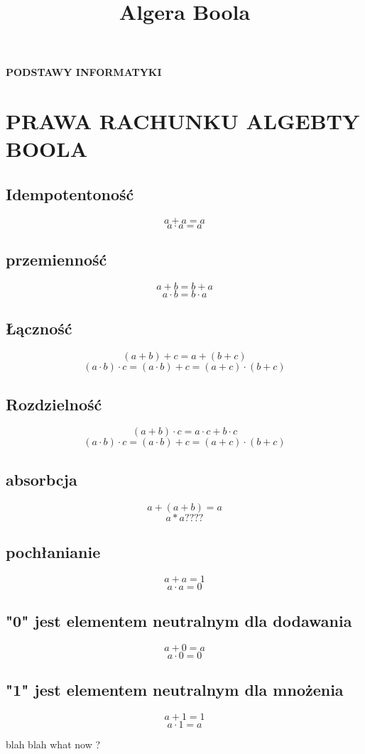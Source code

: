 \documentclass{article}
\title{Algera Boola}
\begin{document}
\begin{titlepage}
    \begin{center}
        \vspace*{1cm}
        
        \Huge

        \textbf{PODSTAWY INFORMATYKI}
        
        \vspace{3cm}
    \end{center}
\end{titlepage}
\newpage
\section{PRAWA RACHUNKU ALGEBTY BOOLA}
\subsection{Idempotentoność}
\[a + a = a\]
\[a \cdot a = a\]
\subsection{przemienność}
\[a + b = b + a\]
\[a \cdot b = b \cdot a\]
\subsection{Łączność}
\[(a + b) + c = a + (b + c)\]
\[(a \cdot b) \cdot c = (a \cdot b) + c = (a + c) \cdot (b + c)\]
\subsection{Rozdzielność}
\[(a + b) \cdot c = a \cdot c + b \cdot c\]
\[(a \cdot b) \cdot c = (a \cdot b) + c = (a + c) \cdot (b + c)\]
\subsection{absorbcja}
\[a + (a + b) = a\]
\[a * a ????\]
\subsection{pochłanianie}
\[a + a = 1\]
\[a \cdot a = 0\]
\subsection{"0" jest elementem neutralnym dla dodawania}
\[a + 0 = a\]
\[a \cdot 0 = 0\]
\subsection{"1" jest elementem neutralnym dla mnożenia}
\[a + 1 = 1\]
\[a \cdot 1 = a\]




blah blah what now ?
\end{document}
